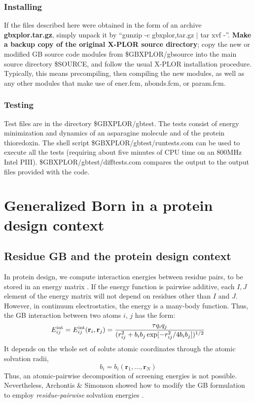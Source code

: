 \documentclass[12pt]{report}
\begin{document}
\subsection{Installing}
If the files described here were obtained in the form of an archive {\bf gbxplor.tar.gz},
simply unpack it by ``gunzip -c gbxplor,tar.gz $|$ tar xvf -''. {\bf Make a backup copy
of the original X-PLOR source directory}; copy the new or modified GB source code modules
from \$GBXPLOR/gbsource into the main source directory \$SOURCE, and follow the usual
X-PLOR installation procedure. Typically, this means precompiling, then compiling the
new modules, as well as any other modules that make use of ener.fcm, nbonds.fcm, or
param.fcm. 

\subsection{Testing}
Test files are in the directory \$GBXPLOR/gbtest. The tests consist of energy minimization
and dynamics of an asparagine molecule and of the protein thioredoxin. The shell script
\$GBXPLOR/gbtest/runtests.com can be used to execute all the tests (requiring about five
minutes of CPU time on an 800MHz Intel PIII). \$GBXPLOR/gbtest/difftests.com compares the
output to the output files provided with the code.

\chapter{Generalized Born in a protein design context}

\section{Residue GB and the protein design context}
In protein design, we compute interaction energies between residue pairs, to be stored in an energy matrix \cite{Simonson13}.
If the energy function is pairwise additive, each $I,J$ element of the energy matrix will not depend on residues other
than $I$ and $J$. However, in continuum electrostatics, the energy is a many-body function. Thus, the GB interaction between
two atoms $i$, $j$ has the form:
\begin{equation}
E_{ij}^{\rm int} = E_{ij}^{\rm int}({\bf r}_i, {\bf r}_j)
              =\frac{\tau q_i q_j}{(r_{ij}^2+b_ib_j\exp[-r_{ij}^2/4b_ib_j])^{1/2}}
\end{equation}
It depends on the whole set of solute atomic coordinates through the atomic solvation radii,
\begin{equation}
b_i=b_i(\textbf{r}_{1},...,\textbf{r}_{N})
\end{equation}
Thus, an atomic-pairwise decomposition of screening energies is not possible. Nevertheless, Archontis \& Simonson showed how
to modify the GB formulation to employ {\it residue-pairwise} solvation energies \cite{Archontis05b}. 
\end{document}
